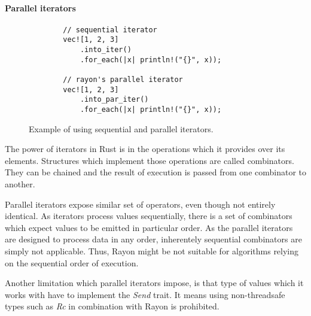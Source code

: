 \paragraph*{Parallel iterators}

\begin{figure}[!htbp] 
    \centering

    \begin{verbatim}
        // sequential iterator
        vec![1, 2, 3]
            .into_iter()
            .for_each(|x| println!("{}", x));

        // rayon's parallel iterator
        vec![1, 2, 3]
            .into_par_iter()
            .for_each(|x| println!("{}", x));
    \end{verbatim}

    \caption{Example of using sequential and parallel iterators.}
    \label{fig:par-iter-example}
\end{figure}

The power of iterators in Rust is in the operations which it provides over its elements. Structures which implement those operations are called combinators. They can be chained and the result of execution is passed from one combinator to another. 

Parallel iterators expose similar set of operators, even though not entirely identical. As iterators process values sequentially, there is a set of combinators which expect values to be emitted in particular order. As the parallel iterators are designed to process data in any order, inherentely sequential combinators are simply not applicable. Thus, Rayon might be not suitable for algorithms relying on the sequential order of execution.

Another limitation which parallel iterators impose, is that type of values which it works with have to implement the \emph{Send} trait. It means using non-threadsafe types such as \emph{Rc} in combination with Rayon is prohibited. 

